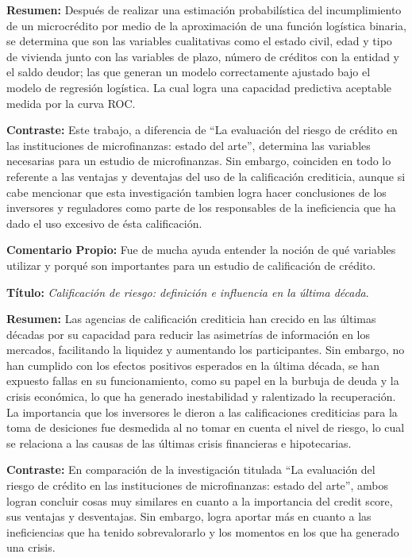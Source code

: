 \documentclass[
  letterpaper,
  DIV=11,
  numbers=noendperiod]{scrreprt}
\begin{document}
\textbf{Resumen:} Después de realizar una estimación probabilística del
incumplimiento de un microcrédito por medio de la aproximación de una
función logística binaria, se determina que son las variables
cualitativas como el estado civil, edad y tipo de vivienda junto con las
variables de plazo, número de créditos con la entidad y el saldo deudor;
las que generan un modelo correctamente ajustado bajo el modelo de
regresión logística. La cual logra una capacidad predictiva aceptable
medida por la curva ROC.

\textbf{Contraste:} Este trabajo, a diferencia de ``La evaluación del
riesgo de crédito en las instituciones de microfinanzas: estado del
arte'', determina las variables necesarias para un estudio de
microfinanzas. Sin embargo, coinciden en todo lo referente a las
ventajas y deventajas del uso de la calificación crediticia, aunque si
cabe mencionar que esta investigación tambien logra hacer conclusiones
de los inversores y reguladores como parte de los responsables de la
ineficiencia que ha dado el uso excesivo de ésta calificación.

\textbf{Comentario Propio:} Fue de mucha ayuda entender la noción de qué
variables utilizar y porqué son importantes para un estudio de
calificación de crédito.

\textbf{Título:} \emph{Calificación de riesgo: definición e influencia
en la última década}.

\textbf{Resumen:} Las agencias de calificación crediticia han crecido en
las últimas décadas por su capacidad para reducir las asimetrías de
información en los mercados, facilitando la liquidez y aumentando los
participantes. Sin embargo, no han cumplido con los efectos positivos
esperados en la última década, se han expuesto fallas en su
funcionamiento, como su papel en la burbuja de deuda y la crisis
económica, lo que ha generado inestabilidad y ralentizado la
recuperación. La importancia que los inversores le dieron a las
calificaciones crediticias para la toma de desiciones fue desmedida al
no tomar en cuenta el nivel de riesgo, lo cual se relaciona a las causas
de las últimas crisis financieras e hipotecarias.

\textbf{Contraste:} En comparación de la investigación titulada ``La
evaluación del riesgo de crédito en las instituciones de microfinanzas:
estado del arte'', ambos logran concluir cosas muy similares en cuanto a
la importancia del credit score, sus ventajas y desventajas. Sin
embargo, logra aportar más en cuanto a las ineficiencias que ha tenido
sobrevalorarlo y los momentos en los que ha generado una crisis.
\end{document}
